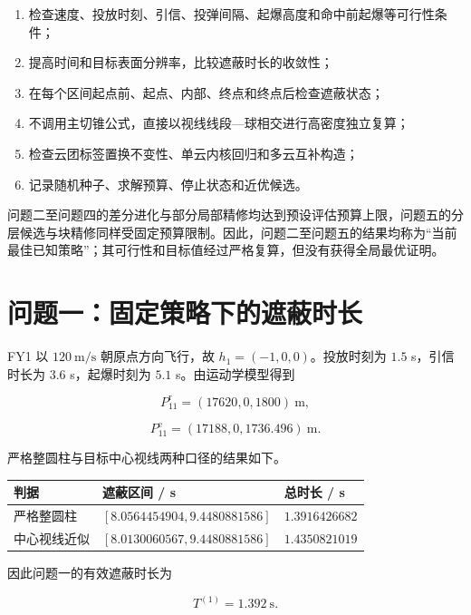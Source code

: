 \begin{enumerate}
\item 检查速度、投放时刻、引信、投弹间隔、起爆高度和命中前起爆等可行性条件；
\item 提高时间和目标表面分辨率，比较遮蔽时长的收敛性；
\item 在每个区间起点前、起点、内部、终点和终点后检查遮蔽状态；
\item 不调用主切锥公式，直接以视线线段—球相交进行高密度独立复算；
\item 检查云团标签置换不变性、单云内核回归和多云互补构造；
\item 记录随机种子、求解预算、停止状态和近优候选。
\end{enumerate}

问题二至问题四的差分进化与部分局部精修均达到预设评估预算上限，问题五的分层候选与块精修同样受固定预算限制。因此，问题二至问题五的结果均称为“当前最佳已知策略”；其可行性和目标值经过严格复算，但没有获得全局最优证明。

\section{问题一：固定策略下的遮蔽时长}

FY1 以 $120\ \mathrm{m/s}$ 朝原点方向飞行，故 $h_1=(-1,0,0)$。投放时刻为 $1.5$ s，引信时长为 $3.6$ s，起爆时刻为 $5.1$ s。由运动学模型得到

\[
P_{11}^{\mathrm r}=(17620,0,1800)\ \mathrm m,
\]

\[
P_{11}^{\mathrm e}=(17188,0,1736.496)\ \mathrm m.
\]

严格整圆柱与目标中心视线两种口径的结果如下。

\begin{center}
\small
\setlength{\tabcolsep}{3pt}
\renewcommand{\arraystretch}{1.18}
\begin{tabularx}{\linewidth}{|X|X|X|}
\hline
\rowcolor{gray!15} \textbf{判据} & \textbf{遮蔽区间 / s} & \textbf{总时长 / s} \\
\hline
严格整圆柱 & $[8.0564454904,\allowbreak{}9.4480881586]$ & $1.3916426682$ \\
\hline
中心视线近似 & $[8.0130060567,\allowbreak{}9.4480881586]$ & $1.4350821019$ \\
\hline
\end{tabularx}
\end{center}

因此问题一的有效遮蔽时长为

\[
\boxed{T^{(1)}=1.392\ \mathrm s}.
\]

